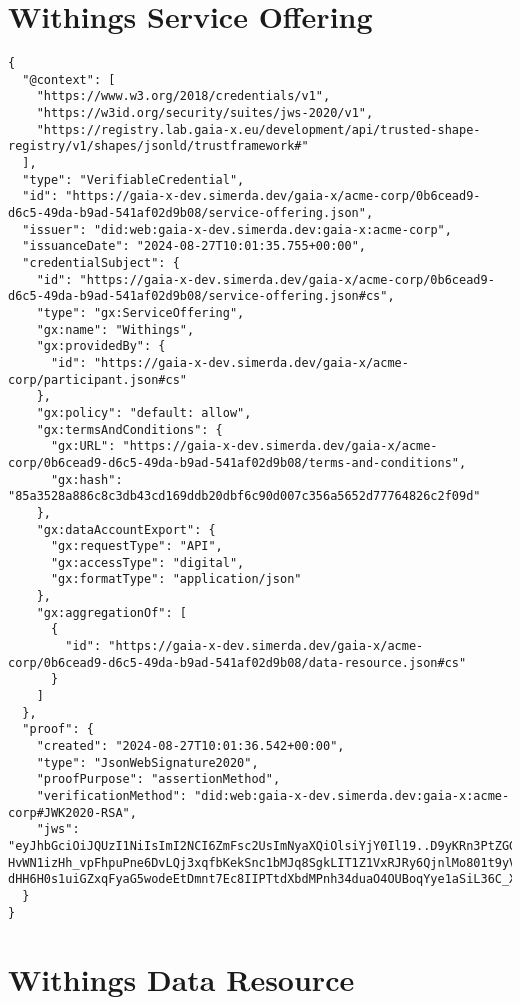 \section{Withings Service Offering}

\begin{verbatim}
{
  "@context": [
    "https://www.w3.org/2018/credentials/v1",
    "https://w3id.org/security/suites/jws-2020/v1",
    "https://registry.lab.gaia-x.eu/development/api/trusted-shape-registry/v1/shapes/jsonld/trustframework#"
  ],
  "type": "VerifiableCredential",
  "id": "https://gaia-x-dev.simerda.dev/gaia-x/acme-corp/0b6cead9-d6c5-49da-b9ad-541af02d9b08/service-offering.json",
  "issuer": "did:web:gaia-x-dev.simerda.dev:gaia-x:acme-corp",
  "issuanceDate": "2024-08-27T10:01:35.755+00:00",
  "credentialSubject": {
    "id": "https://gaia-x-dev.simerda.dev/gaia-x/acme-corp/0b6cead9-d6c5-49da-b9ad-541af02d9b08/service-offering.json#cs",
    "type": "gx:ServiceOffering",
    "gx:name": "Withings",
    "gx:providedBy": {
      "id": "https://gaia-x-dev.simerda.dev/gaia-x/acme-corp/participant.json#cs"
    },
    "gx:policy": "default: allow",
    "gx:termsAndConditions": {
      "gx:URL": "https://gaia-x-dev.simerda.dev/gaia-x/acme-corp/0b6cead9-d6c5-49da-b9ad-541af02d9b08/terms-and-conditions",
      "gx:hash": "85a3528a886c8c3db43cd169ddb20dbf6c90d007c356a5652d77764826c2f09d"
    },
    "gx:dataAccountExport": {
      "gx:requestType": "API",
      "gx:accessType": "digital",
      "gx:formatType": "application/json"
    },
    "gx:aggregationOf": [
      {
        "id": "https://gaia-x-dev.simerda.dev/gaia-x/acme-corp/0b6cead9-d6c5-49da-b9ad-541af02d9b08/data-resource.json#cs"
      }
    ]
  },
  "proof": {
    "created": "2024-08-27T10:01:36.542+00:00",
    "type": "JsonWebSignature2020",
    "proofPurpose": "assertionMethod",
    "verificationMethod": "did:web:gaia-x-dev.simerda.dev:gaia-x:acme-corp#JWK2020-RSA",
    "jws": "eyJhbGciOiJQUzI1NiIsImI2NCI6ZmFsc2UsImNyaXQiOlsiYjY0Il19..D9yKRn3PtZGGU0udRO97s2J8DabvXRzNyZDf7JrlSv4-HvWN1izHh_vpFhpuPne6DvLQj3xqfbKekSnc1bMJq8SgkLIT1Z1VxRJRy6QjnlMo801t9yVPciPxCOsB8N1BoJuRZW4r0GMmrx8-dHH6H0s1uiGZxqFyaG5wodeEtDmnt7Ec8IIPTtdXbdMPnh34duaO4OUBoqYye1aSiL36C_XonFJDXxMrfB6VYFrTWBuIeRFpITegji5t44tajWLTtLfvuI2J4quXmCCRuCHQTUasuSW8ikgnyl0_G8NAVaMijRpttN7dCUs9a8jRUbE20Z6J3RYrRgbq_NPqZ9HzvQ"
  }
}
\end{verbatim}

\section{Withings Data Resource}

